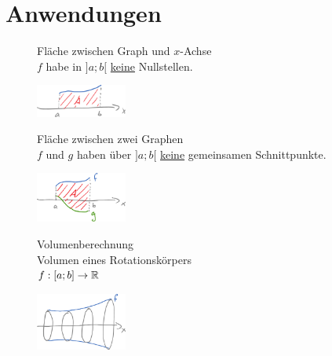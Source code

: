 \clearpage
\section{Anwendungen}
\begin{itemize}
	\begin{figure}[h!]
		\item Fläche zwischen Graph und $x$-Achse\\
		$f$ habe in $]a;b[$ \ul{keine} Nullstellen.
		
		\begin{minipage}{\linewidth-3.2cm}
			\centering
		\end{minipage}
		\begin{minipage}{3.1cm}
			\centering\includegraphics[width=3cm]{Bilder/225}
			\caption{}
		\end{minipage}
	\end{figure}
	
	\begin{figure}[h!]
		\item Fläche zwischen zwei Graphen\\
		$f$ und $g$ haben über $]a;b[$ \ul{keine} gemeinsamen Schnittpunkte.
		
		\begin{minipage}{\linewidth-3.2cm}
			\centering
		\end{minipage}
		\begin{minipage}{3.1cm}
			\centering\includegraphics[width=3cm]{Bilder/226}
			\caption{}
		\end{minipage}
	\end{figure}
	
	\begin{figure}[h!]
		\item Volumenberechnung\\
		Volumen eines Rotationskörpers\\
		$f:[a;b]\to\mathbb{R}$
		
		\begin{minipage}{\linewidth-3.2cm}
			\centering
		\end{minipage}
		\begin{minipage}{3.1cm}
			\centering\includegraphics[width=3cm]{Bilder/227}
			\caption{}
		\end{minipage}
	\end{figure}
	

\end{itemize}
